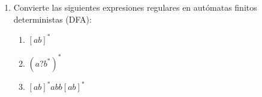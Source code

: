 \documentclass[12pt, letterpaper]{article}
\begin{document}
\begin{enumerate}
\begin{enumerate}
\begin{table}[H]
      \end{table}
      Así $G_7$ es consistente, entonces lo marcamos y nos quedan los grupos:
      \begin{align*}
        \ast G_1 &= \{4\} \\
        \ast G_4 &= \{1\} \\
        \ast G_5 &= \{3\} \\
        \ast G_6 &= \{0\} \\
        \ast G_7 &= \{2, 5\}
      \end{align*}
      Todos los grupos están marcados, entonces ahora si cada grupo va a ser un estado del nuevo DFA y hacemos lo mismo que en el ejercicio anterior para las transiciones, estado inicial y estados de aceptación.\\
      Por lo tanto, el DFA mínimo es:
      \begin{center}
      \end{center}
    \end{enumerate}
  \item Convierte las siguientes expresiones regulares en autómatas finitos deterministas (DFA):
    \begin{enumerate}
    \item $[ab]^*$
    \item $(a?b^*)^*$
    \item $[ab]^*abb[ab]^*$
    \end{enumerate}


\end{enumerate}
\end{document}
